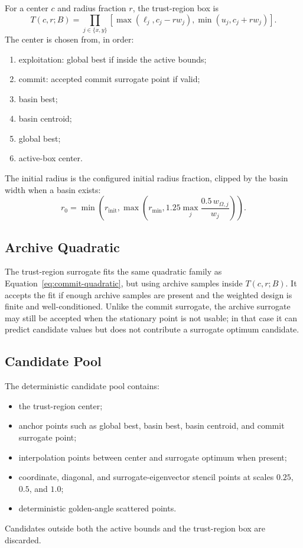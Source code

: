 \documentclass[11pt]{article}
\begin{document}
For a center $c$ and radius fraction $r$, the trust-region box is
\begin{equation}
T(c,r;B)=
\prod_{j\in\{x,y\}}
\left[
\max(\ell_j,c_j-rw_j),
\min(u_j,c_j+rw_j)
\right].
\label{eq:trust-bounds}
\end{equation}
The center is chosen from, in order:
\begin{enumerate}[nosep]
\item exploitation: global best if inside the active bounds;
\item commit: accepted commit surrogate point if valid;
\item basin best;
\item basin centroid;
\item global best;
\item active-box center.
\end{enumerate}
The initial radius is the configured initial radius fraction, clipped by the
basin width when a basin exists:
\begin{equation}
r_0 = \min\left(r_{\mathrm{init}},
\max\left(r_{\min},1.25\max_j\frac{0.5\,w_{\Omega,j}}{w_j}\right)\right).
\label{eq:initial-radius}
\end{equation}

\subsection{Archive Quadratic}

The trust-region surrogate fits the same quadratic family as
Equation~\eqref{eq:commit-quadratic}, but using archive samples inside
$T(c,r;B)$. It accepts the fit if enough archive samples are present and the
weighted design is finite and well-conditioned. Unlike the commit surrogate,
the archive surrogate may still be accepted when the stationary point is not
usable; in that case it can predict candidate values but does not contribute a
surrogate optimum candidate.

\subsection{Candidate Pool}

The deterministic candidate pool contains:
\begin{itemize}[nosep]
\item the trust-region center;
\item anchor points such as global best, basin best, basin centroid, and
commit surrogate point;
\item interpolation points between center and surrogate optimum when present;
\item coordinate, diagonal, and surrogate-eigenvector stencil points at
scales $0.25$, $0.5$, and $1.0$;
\item deterministic golden-angle scattered points.
\end{itemize}
Candidates outside both the active bounds and the trust-region box are
discarded.
\end{document}

